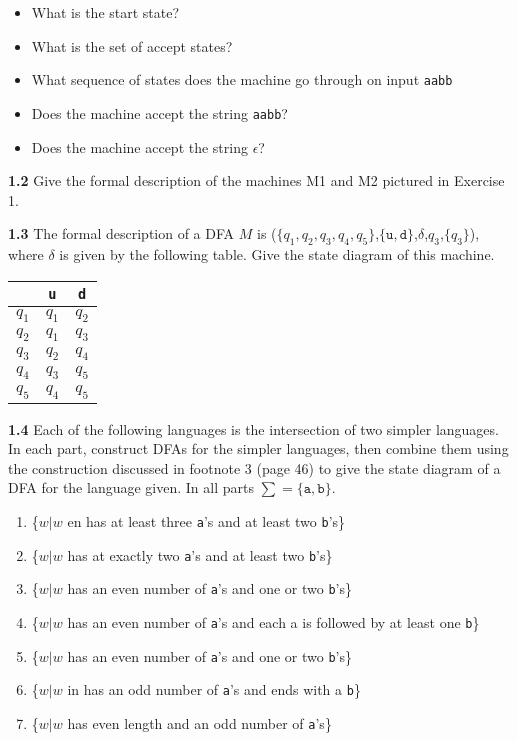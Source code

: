 \documentclass{article}
\begin{document}
        \begin{itemize}
\item What is the start state?
\item What is the set of accept states?
\item What sequence of states does the machine go through on input \texttt{aabb}
\item Does the machine accept the string \texttt{aabb}?
\item Does the machine accept the string $\epsilon$?
        \end{itemize}

\textbf{1.2} Give the formal description of the machines M1 and M2 pictured in
Exercise 1.


\textbf{1.3} The formal description of a DFA $M$ is
($\{q_1,q_2,q_3,q_4,q_5\}$,$\{\texttt{u},\texttt{d}\}$,$\delta$,$q_3$,$\{q_3\}$),
where $\delta$ is given by the following table. Give the state diagram of this
machine.

\begin{center}
\begin{tabular}{c|cc}
            &   \texttt{u}     &   \texttt{d} \\
    \hline
    $q_1$   &   $q_1$   &   $q_2$   \\
    $q_2$   &   $q_1$   &   $q_3$   \\
    $q_3$   &   $q_2$   &   $q_4$   \\
    $q_4$   &   $q_3$   &   $q_5$   \\
    $q_5$   &   $q_4$   &   $q_5$
\end{tabular}
\end{center}


\textbf{1.4} Each of the following languages is the intersection of two simpler
languages. In each part, construct DFAs for the simpler languages, then combine
them using the construction discussed in footnote 3 (page 46) to give the state
diagram of a DFA for the language given. In all parts $\sum = \{\texttt{a},
\texttt{b}\}$.

    \begin{enumerate}
        \item \{$w|w$ en has at least three \texttt{a}'s and at least two \texttt{b}'s\}
        \item \{$w|w$ has at exactly two \texttt{a}'s and at least two \texttt{b}'s\}
        \item \{$w|w$ has an even number of \texttt{a}'s and one or two \texttt{b}'s\}
        \item \{$w|w$ has an even number of \texttt{a}'s and each a is followed by at least one \texttt{b}\}
        \item \{$w|w$ has an even number of \texttt{a}'s and one or two \texttt{b}'s\}
        \item \{$w|w$ in has an odd number of \texttt{a}'s and ends with a \texttt{b}\}
        \item \{$w|w$ has even length and an odd number of \texttt{a}'s\}
    \end{enumerate}
\end{document}
